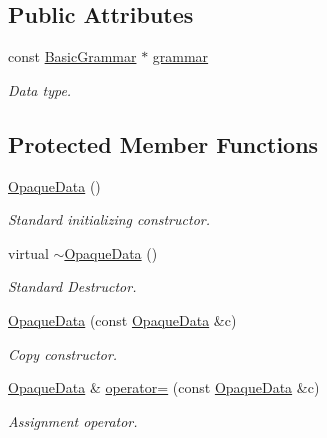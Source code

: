 \subsection*{Public Attributes}
\begin{DoxyCompactItemize}
\item 
const \hyperlink{class_d_d4hep_1_1_basic_grammar}{Basic\+Grammar} $\ast$ \hyperlink{class_d_d4hep_1_1_opaque_data_ac911f7e23be3e5d583bf5ccebae03e31}{grammar}
\begin{DoxyCompactList}\small\item\em Data type. \end{DoxyCompactList}\end{DoxyCompactItemize}
\subsection*{Protected Member Functions}
\begin{DoxyCompactItemize}
\item 
\hyperlink{class_d_d4hep_1_1_opaque_data_a7651964645b371a757c78163ce663fd2}{Opaque\+Data} ()
\begin{DoxyCompactList}\small\item\em Standard initializing constructor. \end{DoxyCompactList}\item 
virtual \hyperlink{class_d_d4hep_1_1_opaque_data_aff696a10919b804f7bb347f9430b39b3}{$\sim$\+Opaque\+Data} ()
\begin{DoxyCompactList}\small\item\em Standard Destructor. \end{DoxyCompactList}\item 
\hyperlink{class_d_d4hep_1_1_opaque_data_ae734cb8604b7f256cfd66e4e460913d3}{Opaque\+Data} (const \hyperlink{class_d_d4hep_1_1_opaque_data}{Opaque\+Data} \&c)
\begin{DoxyCompactList}\small\item\em Copy constructor. \end{DoxyCompactList}\item 
\hyperlink{class_d_d4hep_1_1_opaque_data}{Opaque\+Data} \& \hyperlink{class_d_d4hep_1_1_opaque_data_ab939ef76406d35f26e6913a392741e72}{operator=} (const \hyperlink{class_d_d4hep_1_1_opaque_data}{Opaque\+Data} \&c)
\begin{DoxyCompactList}\small\item\em Assignment operator. \end{DoxyCompactList}\end{DoxyCompactItemize}

